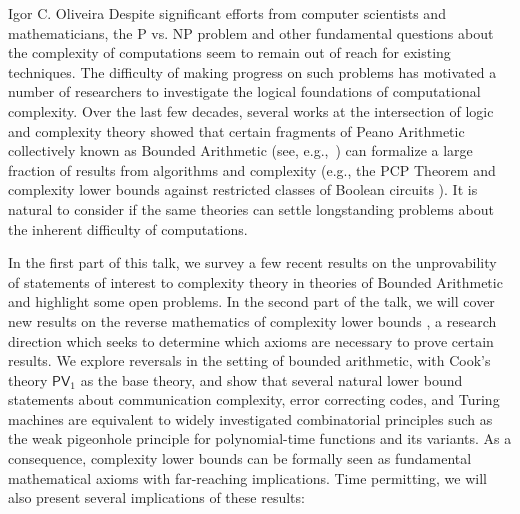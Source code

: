 \documentclass[report]{owrart}
\begin{document}
\begin{report}
\begin{talk}{Igor C. Oliveira}
    \noindent
    Despite significant efforts from computer scientists and mathematicians, the P vs. NP problem and other fundamental questions about the complexity of computations seem to remain out of reach for existing techniques. The difficulty of making progress on such problems has motivated a number of researchers to investigate the logical foundations of computational complexity. Over the last few decades, several works at the intersection of logic and complexity theory showed that certain fragments of Peano Arithmetic collectively known as Bounded Arithmetic (see, e.g.,~\cite{Krajicek-book, cook_nguyen_2010}) can formalize a large fraction of results from algorithms and complexity (e.g., the PCP Theorem \cite{DBLP:journals/corr/Pich14} and complexity lower bounds against restricted classes of Boolean circuits \cite{DBLP:journals/apal/MullerP20}). It is natural to consider if the same theories can settle longstanding problems about the inherent difficulty of computations. 

In the first part of this talk, we survey a few recent results \cite{KO17, BKO20, DBLP:journals/aml/BydzovskyM20, CKKO21, DBLP:conf/stoc/PichS21, DBLP:conf/stoc/AtseriasBM23, LO23} on the unprovability of statements of interest to complexity theory in theories of Bounded Arithmetic and highlight some open problems. In the second part of the talk, we will cover new results on the reverse mathematics of complexity lower bounds \cite{CLO24}, a research direction which seeks to determine which axioms are necessary to prove certain results. We explore reversals in the setting of bounded arithmetic, with Cook's theory $\mathsf{PV}_1$ as the base theory, and show that several natural lower bound statements about communication complexity, error correcting codes, and Turing machines are equivalent to widely investigated combinatorial principles such as the weak pigeonhole principle for polynomial-time functions and its variants. As a consequence, complexity lower bounds can be formally seen as fundamental mathematical axioms with far-reaching implications. Time permitting, we will also present several implications of these results: 


\end{talk}
\end{report}
\end{document}
